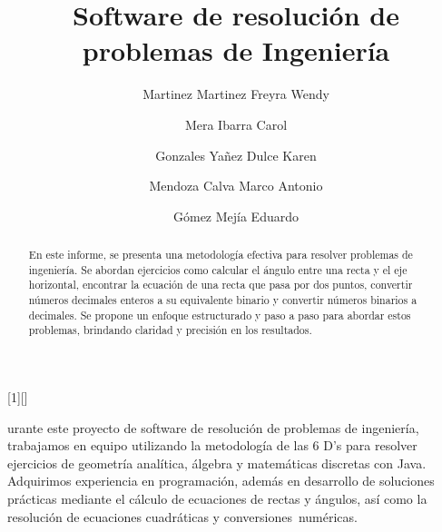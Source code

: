 \documentclass{IEEEcsmag}
\begin{document}
[1][]
{}
{}



\title{Software de resolución de problemas de Ingeniería }

\author{Martinez Martinez Freyra Wendy}

\author{Mera Ibarra Carol}

\author{Gonzales Yañez Dulce Karen}

\author{Mendoza Calva Marco Antonio}

\author{Gómez Mejía Eduardo}



\begin{abstract}
 En este informe, se presenta una metodología efectiva para resolver problemas de ingeniería. Se abordan ejercicios como calcular el ángulo entre una recta y el eje horizontal, encontrar la ecuación de una recta que pasa por dos puntos, convertir números decimales enteros a su equivalente binario y convertir números binarios a decimales. Se propone un enfoque estructurado y paso a paso para abordar estos problemas, brindando claridad y precisión en los resultados.
\end{abstract}

\maketitle
{}urante este proyecto de software de resolución de problemas de ingeniería, trabajamos en equipo utilizando la metodología de las 6 D's para resolver ejercicios de geometría analítica, álgebra y matemáticas discretas con Java. Adquirimos experiencia en programación, además en desarrollo de soluciones prácticas mediante el cálculo de ecuaciones de rectas y ángulos, así como la resolución de ecuaciones cuadráticas y conversiones numéricas.
\end{document}
